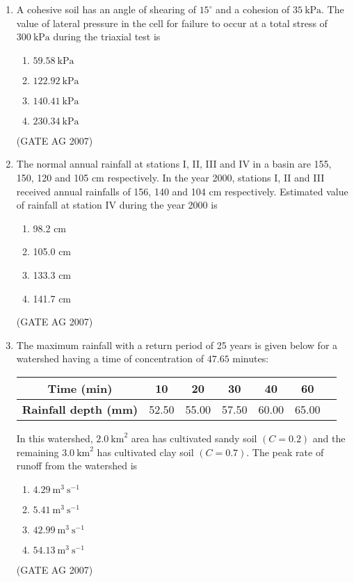 \documentclass[journal,12pt,onecolumn]{IEEEtran}
\theoremstyle{remark}
\begin{document}
\begin{enumerate}
\item A cohesive soil has an angle of shearing of $15^\circ$ and a cohesion of $35\ \text{kPa}$. The value of lateral pressure in the cell for failure to occur at a total stress of $300\ \text{kPa}$ during the triaxial test is

\begin{multicols}{4}
\begin{enumerate}
\item $59.58\ \text{kPa}$
\item $122.92\ \text{kPa}$
\item $140.41\ \text{kPa}$
\item $230.34\ \text{kPa}$
\end{enumerate}
\end{multicols}
\hfill(GATE AG 2007)

\item The normal annual rainfall at stations I, II, III and IV in a basin are 155, 150, 120 and 105 cm respectively. In the year 2000, stations I, II and III received annual rainfalls of 156, 140 and 104 cm respectively. Estimated value of rainfall at station IV during the year 2000 is
\begin{multicols}{4}
\begin{enumerate}
\item 98.2 cm
\item 105.0 cm
\item 133.3 cm
\item 141.7 cm
\end{enumerate}
\end{multicols}
\hfill(GATE AG 2007)

\item The maximum rainfall with a return period of 25 years is given below for a watershed having a time of concentration of $47.65$ minutes:

\begin{table}[H]
\centering
\begin{tabular}{|c|c|c|c|c|c|c|}
\hline
\textbf{Time (min)} & 10 & 20 & 30 & 40 & 60 \\
\hline
\textbf{Rainfall depth (mm)} & 52.50 & 55.00 & 57.50 & 60.00 & 65.00 \\
\hline
\end{tabular}
\end{table}

In this watershed, $2.0\ \text{km}^2$ area has cultivated sandy soil $(C = 0.2)$ and the remaining $3.0\ \text{km}^2$ has cultivated clay soil $(C = 0.7)$. The peak rate of runoff from the watershed is
\begin{multicols}{4}
\begin{enumerate}
\item $4.29\ \text{m}^3\ \text{s}^{-1}$
\item $5.41\ \text{m}^3\ \text{s}^{-1}$
\item $42.99\ \text{m}^3\ \text{s}^{-1}$
\item $54.13\ \text{m}^3\ \text{s}^{-1}$
\end{enumerate}
\end{multicols}
\hfill(GATE AG 2007)


\end{enumerate}
\end{document}
